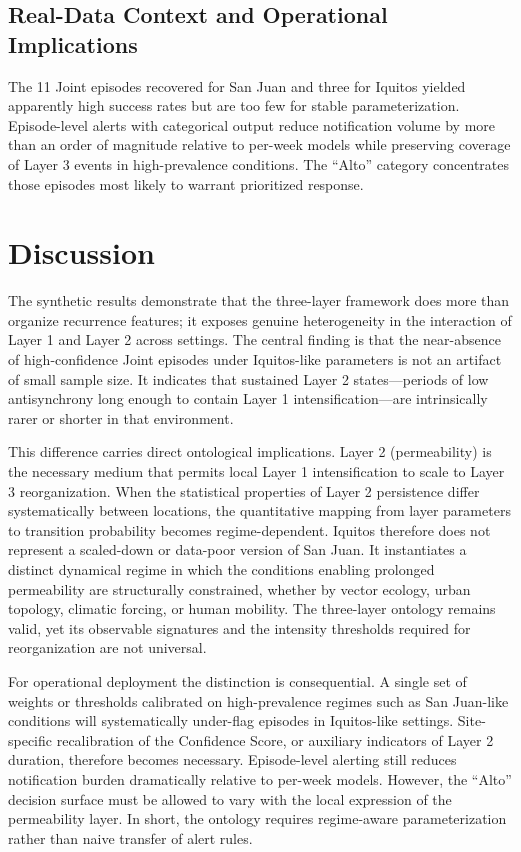 \documentclass[11pt,a4paper]{article}
\begin{document}
\subsection{Real-Data Context and Operational Implications}

The 11 Joint episodes recovered for San Juan and three for Iquitos yielded apparently high success rates but are too few for stable parameterization. Episode-level alerts with categorical output reduce notification volume by more than an order of magnitude relative to per-week models while preserving coverage of Layer 3 events in high-prevalence conditions. The “Alto” category concentrates those episodes most likely to warrant prioritized response.

\section{Discussion}

The synthetic results demonstrate that the three-layer framework does more than organize recurrence features; it exposes genuine heterogeneity in the interaction of Layer 1 and Layer 2 across settings. The central finding is that the near-absence of high-confidence Joint episodes under Iquitos-like parameters is not an artifact of small sample size. It indicates that sustained Layer 2 states---periods of low antisynchrony long enough to contain Layer 1 intensification---are intrinsically rarer or shorter in that environment.

This difference carries direct ontological implications. Layer 2 (permeability) is the necessary medium that permits local Layer 1 intensification to scale to Layer 3 reorganization. When the statistical properties of Layer 2 persistence differ systematically between locations, the quantitative mapping from layer parameters to transition probability becomes regime-dependent. Iquitos therefore does not represent a scaled-down or data-poor version of San Juan. It instantiates a distinct dynamical regime in which the conditions enabling prolonged permeability are structurally constrained, whether by vector ecology, urban topology, climatic forcing, or human mobility. The three-layer ontology remains valid, yet its observable signatures and the intensity thresholds required for reorganization are not universal.

For operational deployment the distinction is consequential. A single set of weights or thresholds calibrated on high-prevalence regimes such as San Juan-like conditions will systematically under-flag episodes in Iquitos-like settings. Site-specific recalibration of the Confidence Score, or auxiliary indicators of Layer 2 duration, therefore becomes necessary. Episode-level alerting still reduces notification burden dramatically relative to per-week models. However, the ``Alto'' decision surface must be allowed to vary with the local expression of the permeability layer. In short, the ontology requires regime-aware parameterization rather than naive transfer of alert rules.
\end{document}
